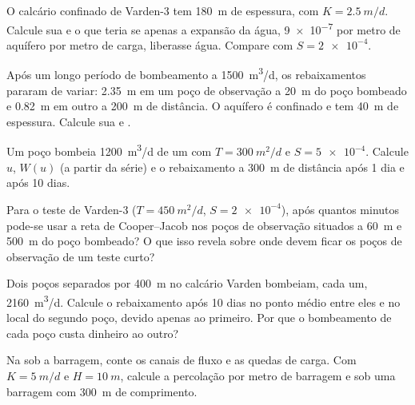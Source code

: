 \begin{exercise}[$\star$]\label{exo:b3:hydrogeology:4}
O calcário confinado de Varden-3 tem \qty{180}{m} de espessura, com $K =
\qty{2.5}{m/d}$. Calcule sua  e o  que teria
se apenas a expansão da água, \num{9e-7} por metro de aquífero
por metro de carga, liberasse água. Compare com $S = \num{2e-4}$.
\end{exercise}

\begin{exercise}[$\star\star$]\label{exo:b3:hydrogeology:5}
Após um longo período de bombeamento a \qty{1500}{m^3/d}, os rebaixamentos
pararam de variar: \qty{2.35}{m} em um poço de observação a \qty{20}{m} do
poço bombeado e \qty{0.82}{m} em outro a \qty{200}{m} de distância. O aquífero é
confinado e tem \qty{40}{m} de espessura. Calcule sua  e .
\end{exercise}

\begin{exercise}[$\star\star$]\label{exo:b3:hydrogeology:6}
Um poço bombeia \qty{1200}{m^3/d} de um  com $T =
\qty{300}{m^2/d}$ e $S = \num{5e-4}$. Calcule $u$, $W(u)$ (a partir da
série) e o rebaixamento a \qty{300}{m} de distância após 1 dia e após 10 dias.
\end{exercise}

\begin{exercise}[$\star\star$]\label{exo:b3:hydrogeology:7}
Para o teste de Varden-3 ($T = \qty{450}{m^2/d}$, $S = \num{2e-4}$), após quantos minutos
pode-se usar a reta de Cooper--Jacob nos poços de observação
situados a \qty{60}{m} e \qty{500}{m} do poço bombeado? O que isso revela
sobre onde devem ficar os poços de observação de um teste curto?
\end{exercise}

\begin{exercise}[$\star\star$]\label{exo:b3:hydrogeology:8}
Dois poços separados por \qty{400}{m} no calcário Varden bombeiam, cada um,
\qty{2160}{m^3/d}. Calcule o rebaixamento após 10 dias no ponto médio entre eles
e no local do segundo poço, devido apenas ao primeiro. Por que o
bombeamento de cada poço custa dinheiro ao outro?
\end{exercise}

\begin{exercise}[$\star\star$]\label{exo:b3:hydrogeology:9}
Na  sob a barragem, conte os canais de fluxo e as quedas de carga.
Com $K = \qty{5}{m/d}$ e $H = \qty{10}{m}$, calcule a percolação por metro
de barragem e sob uma barragem com \qty{300}{m} de comprimento.
\end{exercise}

